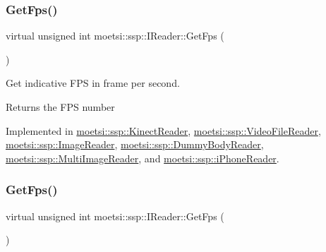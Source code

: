 \mbox{\label{classmoetsi_1_1ssp_1_1IReader_a9f6a8650ca290b011b8e5451eeae9f32}} 
\subsubsection{\texorpdfstring{Get\+Fps()}{GetFps()}\hspace{0.1cm}{\footnotesize\ttfamily [1/2]}}
{\footnotesize\ttfamily virtual unsigned int moetsi\+::ssp\+::\+I\+Reader\+::\+Get\+Fps (\begin{DoxyParamCaption}{ }\end{DoxyParamCaption})\hspace{0.3cm}{\ttfamily [pure virtual]}}



Get indicative F\+PS in frame per second. 

\begin{DoxyReturn}{Returns}
the F\+PS number 
\end{DoxyReturn}


Implemented in \hyperlink{classmoetsi_1_1ssp_1_1KinectReader_ac88c13693ce8e2e249438ac8de8a7b3c}{moetsi\+::ssp\+::\+Kinect\+Reader}, \hyperlink{classmoetsi_1_1ssp_1_1VideoFileReader_a83359ad82898acdb75240568b182247c}{moetsi\+::ssp\+::\+Video\+File\+Reader}, \hyperlink{classmoetsi_1_1ssp_1_1ImageReader_a86adfec8106c366aaf1ec63e2a7da156}{moetsi\+::ssp\+::\+Image\+Reader}, \hyperlink{classmoetsi_1_1ssp_1_1DummyBodyReader_a7dab48cb8ec247add0c57d98e6cd5fb4}{moetsi\+::ssp\+::\+Dummy\+Body\+Reader}, \hyperlink{classmoetsi_1_1ssp_1_1MultiImageReader_ad0a249af66f8e1a063c3e575fc1b94cb}{moetsi\+::ssp\+::\+Multi\+Image\+Reader}, and \hyperlink{classmoetsi_1_1ssp_1_1iPhoneReader_a4bb216847a6c2ed8eb5d31788a0b8477}{moetsi\+::ssp\+::i\+Phone\+Reader}.

\mbox{\label{classmoetsi_1_1ssp_1_1IReader_a9f6a8650ca290b011b8e5451eeae9f32}} 
\subsubsection{\texorpdfstring{Get\+Fps()}{GetFps()}\hspace{0.1cm}{\footnotesize\ttfamily [2/2]}}
{\footnotesize\ttfamily virtual unsigned int moetsi\+::ssp\+::\+I\+Reader\+::\+Get\+Fps (\begin{DoxyParamCaption}{ }\end{DoxyParamCaption})\hspace{0.3cm}{\ttfamily [pure virtual]}}



